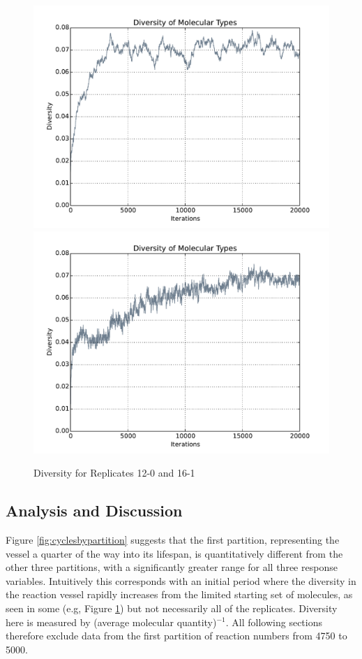 
\begin{figure}[h]
	\centering
	\includegraphics[width=0.45\linewidth]{figures/PlotMolecularDiversity-strategies-12-0}
	\includegraphics[width=0.45\linewidth]{figures/PlotMolecularDiversity-strategies-16-1}
	\caption{Diversity for Replicates 12-0 and 16-1}\label{fig:diversity}
\end{figure}

\subsection{Analysis and Discussion}
Figure \cref{fig:cyclesbypartition} suggests that the first partition, representing the vessel a quarter of the way into its lifespan, is quantitatively different from the other three partitions, with a significantly greater range for all three response variables. Intuitively this corresponds with an initial period where the diversity in the reaction vessel rapidly increases from the limited starting set of molecules, as seen in some (e.g, Figure \cref{fig:diversity}) but not necessarily all of the replicates. Diversity here is measured by (average molecular quantity)$^{-1}$. All following sections therefore exclude data from the first partition of reaction numbers from 4750 to 5000.

